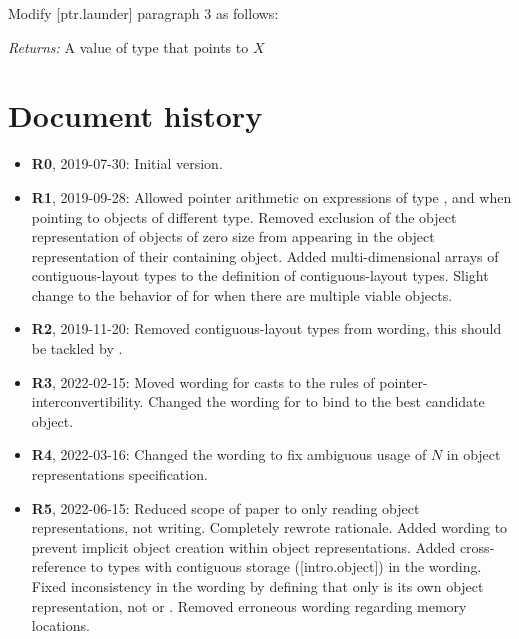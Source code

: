 Modify [ptr.launder] paragraph 3 as follows:

\begin{adjustwidth}{0.5cm}{0.5cm}
\emph{Returns: } A value of type  that points to  $X$ 
\end{adjustwidth}


\section*{Document history}

\begin{itemize}
  \item \textbf{R0}, 2019-07-30: Initial version.
  \item \textbf{R1}, 2019-09-28: Allowed pointer arithmetic on expressions of type ,  and  when pointing to objects of different type. Removed exclusion of the object representation of objects of zero size from appearing in the object representation of their containing object. Added multi-dimensional arrays of contiguous-layout types to the definition of contiguous-layout types. Slight change to the behavior of  for when there are multiple viable objects.
  \item \textbf{R2}, 2019-11-20: Removed contiguous-layout types from wording, this should be tackled by \cite{P1945R0}.
  \item \textbf{R3}, 2022-02-15: Moved wording for casts to the rules of pointer-interconvertibility. Changed the wording for  to bind to the best candidate object.
  \item \textbf{R4}, 2022-03-16: Changed the wording to fix ambiguous usage of $N$ in object representations specification.
  \item \textbf{R5}, 2022-06-15: Reduced scope of paper to only reading object representations, not writing. Completely rewrote rationale. Added wording to prevent implicit object creation within object representations. Added cross-reference to types with contiguous storage ([intro.object]) in the wording. Fixed inconsistency in the wording by defining that only  is its own object representation, not  or . Removed erroneous wording regarding memory locations.
\end{itemize}





\renewcommand{\bibname}{References}



